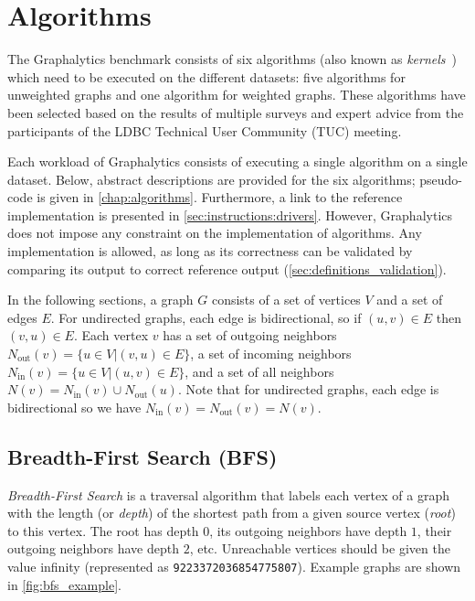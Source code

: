 \section{Algorithms}
\label{sec:definition_algorithms}

The Graphalytics benchmark consists of six algorithms (also known as \emph{kernels}~\cite{DBLP:conf/hipc/BaderM05}) which need to be executed on the different datasets: five algorithms for unweighted graphs and one algorithm for weighted graphs. These algorithms have been selected based on the results of multiple surveys and expert advice from the participants of the LDBC Technical User Community (TUC) meeting.

Each workload of Graphalytics consists of executing a single algorithm on a single dataset. Below, abstract descriptions are provided for the six algorithms; pseudo-code is given in \autoref{chap:algorithms}. Furthermore, a link to the reference implementation is presented in \autoref{sec:instructions:drivers}. However, Graphalytics does not impose any constraint on the implementation of algorithms. Any implementation is allowed, as long as its correctness can be validated by comparing its output to correct reference output (\autoref{sec:definitions_validation}). 

In the following sections, a graph $G$ consists of a set of vertices $V$ and a set of edges $E$. For undirected graphs, each edge is bidirectional, so if $(u,v)\in E$ then $(v,u)\in E$. Each vertex $v$ has a set of outgoing neighbors
$N_\mathrm{out}(v) = \{u \in V | (v, u) \in E \}$, a set of incoming neighbors
$N_\mathrm{in}(v)  = \{u \in V | (u, v) \in E \}$, and a set of all neighbors
$N(v) = N_\mathrm{in}(v) \cup N_\mathrm{out}(u)$.
Note that for undirected graphs, each edge is bidirectional so we have $N_\mathrm{in}(v) = N_\mathrm{out}(v) = N(v)$.


\subsection{Breadth-First Search (BFS)}
\label{sec:bfs}
\emph{Breadth-First Search} is a traversal algorithm that labels each vertex of a graph with the length (or \emph{depth}) of the shortest path from a given source vertex (\emph{root}) to this vertex. The root has depth $0$, its outgoing neighbors have depth $1$, their outgoing neighbors have depth $2$, etc. Unreachable vertices should be given the value infinity
(represented as \texttt{9223372036854775807}).
Example graphs are shown in \autoref{fig:bfs_example}.


